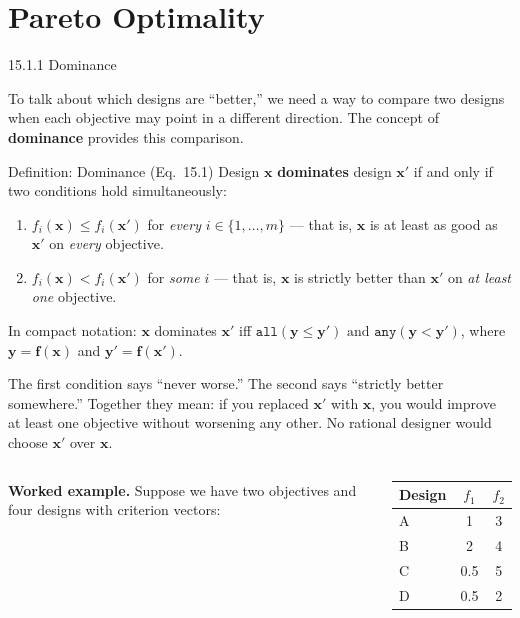 \documentclass[aspectratio=169,10pt]{beamer}
\newcommand{\bx}{\mathbf{x}}
\newcommand{\by}{\mathbf{y}}
\newcommand{\bff}{\mathbf{f}}
\begin{document}
\section{Pareto Optimality}

\begin{frame}[allowframebreaks]{15.1.1 Dominance}

To talk about which designs are ``better,'' we need a way to compare two
designs when each objective may point in a different direction.  The concept
of \textbf{dominance} provides this comparison.

\begin{block}{Definition: Dominance (Eq.\ 15.1)}
  Design $\bx$ \textbf{dominates} design $\bx'$ if and only if two conditions
  hold simultaneously:
  \begin{enumerate}
    \item $f_i(\bx) \le f_i(\bx')$ for \emph{every} $i \in \{1, \ldots, m\}$
      --- that is, $\bx$ is at least as good as $\bx'$ on \emph{every}
      objective.
    \item $f_i(\bx) < f_i(\bx')$ for \emph{some} $i$ --- that is, $\bx$ is
      strictly better than $\bx'$ on \emph{at least one} objective.
  \end{enumerate}
  In compact notation: $\bx$ dominates $\bx'$ iff
  $\mathtt{all}(\by \le \by') \text{ and } \mathtt{any}(\by < \by')$,
  where $\by = \bff(\bx)$ and $\by' = \bff(\bx')$.
\end{block}

The first condition says ``never worse.''  The second says ``strictly better
somewhere.''  Together they mean: if you replaced $\bx'$ with $\bx$, you would
improve at least one objective without worsening any other.  No rational
designer would choose $\bx'$ over $\bx$.

\begin{columns}
\textbf{Worked example.}  Suppose we have two objectives and four designs with
criterion vectors:
\begin{center}
\begin{tabular}{lcc}
\toprule
Design & $f_1$ & $f_2$ \\
\midrule
A & 1 & 3 \\
B & 2 & 4 \\
C & 0.5 & 5 \\
D & 0.5 & 2 \\
\bottomrule
\end{tabular}
\end{center}


\end{columns}
\end{frame}
\end{document}
